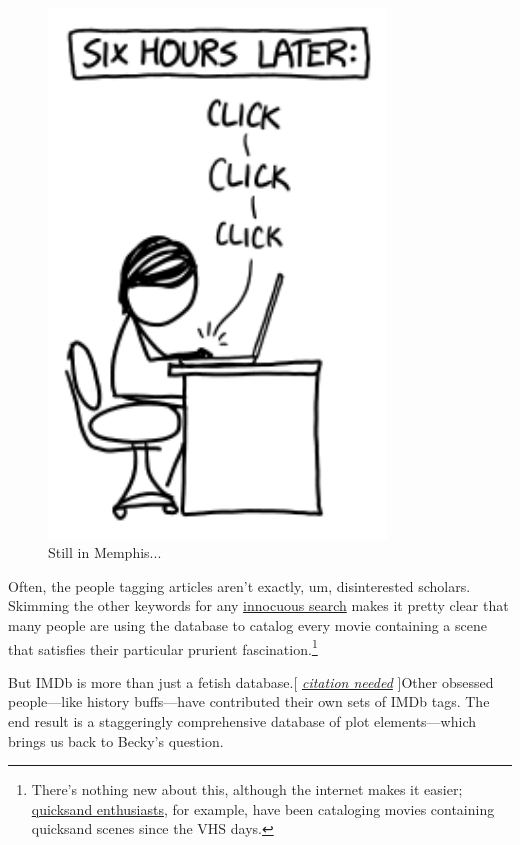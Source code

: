 {\begin{figure}[!htbp]
\centering
\includegraphics[scale=0.5, max width=0.8\textwidth]{imgs/a/100/hours.png}
\caption{Still in Memphis...}
\end{figure}

{Often, the people tagging articles aren't exactly, um, disinterested scholars. Skimming the other keywords for any \href{http://www.imdb.com/keyword/shirt/}{innocuous search} makes it pretty clear that many people are using the database to catalog every movie containing a scene that satisfies their particular prurient fascination.{\footnote{There's nothing new about this, although the internet makes it easier; \href{http://www.slate.com/articles/health\_and\_science/science/2010/08/terra\_infirma.single.html} {quicksand enthusiasts}, for example, have been cataloging movies containing quicksand scenes since the VHS days.} } }

{But IMDb is more than just a fetish database.[ \emph{ \href{http://www.imdb.com/title/tt0568244/?ref\_=fn\_al\_tt\_1}{citation needed}} ]Other obsessed people—like history buffs—have contributed their own sets of IMDb tags. The end result is a staggeringly comprehensive database of plot elements—which brings us back to Becky's question.}

}
